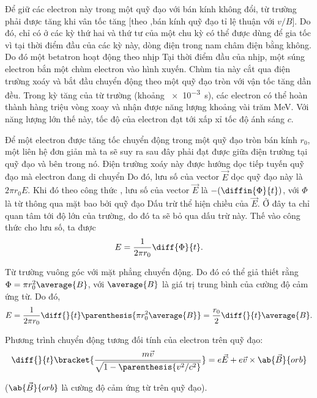 Để giữ các electron này trong một quỹ đạo với bán kính không đổi, từ trường phải được tăng khi vân tốc tăng [theo ,bán kính quỹ đạo tỉ lệ thuận với $v/B$].
Do đó, chỉ có ở các kỳ thứ hai và thứ tư của một chu kỳ có thể được dùng để gia tốc vì tại thời điểm đầu của các kỳ này, dòng điện trong nam châm điện bằng không.
Do đó một betatron hoạt động theo nhịp
Tại thời điểm đầu của nhịp, một súng electron bắn một chùm electron vào hình xuyến.
Chùm tia này cắt qua điện trường xoáy và bắt đầu chuyển động theo một quỹ đạo tròn với vận tốc tăng dần đều.
Trong kỳ tăng của từ trường (khoảng \SI{e-3}{\second}), các electron có thể hoàn thành hàng triệu vòng xoay và nhận được năng lượng khoảng vài trăm \si{\mega\electronvolt}.
Với năng lượng lớn thế này, tốc độ của electron đạt tới xấp xỉ tốc độ ánh sáng $c$.

Để một electron được tăng tốc chuyển động trong một quỹ đạo tròn bán kính $r_0$, một liên hệ đơn giản mà ta sẽ suy ra sau đây phải đạt được giữa điện trường tại quỹ đạo và bên trong nó.
Điện trường xoáy này được hướng dọc tiếp tuyến quỹ đạo mà electron đang di chuyển
Do đó, lưu số của vector $\vec{E}$ dọc quỹ đạo này là $2\pi r_0E$.
Khi đó theo công thức , lưu số của vector $\vec{E}$ là $-(\diffin{\Phi}{t})$, với $\Phi$ là từ thông qua mặt bao bởi quỹ đạo
Dấu trừ thể hiện chiều của $\vec{E}$.
Ở đây ta chỉ quan tâm tới độ lớn của trường, do đó ta sẽ bỏ qua dấu trừ này.
Thế vào công thức cho lưu số, ta được
\begin{equation*}
    E = \frac{1}{2\pi r_0} \diff{\Phi}{t}.
\end{equation*}

\noindent
Từ trường vuông góc với mặt phẳng chuyển động.
Do đó có thể giả thiết rằng $\Phi=\pi r^2_0\average{B}$, với $\average{B}$ là giá trị trung bình của cường độ cảm ứng từ.
Do đó,
\begin{equation}\label{eq:10_30}
    E = \frac{1}{2\pi r_0} \diff{}{t} \parenthesis{ \pi r^2_0 \average{B}} = \frac{r_0}{2} \diff{}{t} \average{B}.
\end{equation}

Phương trình chuyển động tương đối tính của electron trên quỹ đạo:
\begin{equation}\label{eq:10_31}
    \diff{}{t}\bracket{ \frac{m \vec{v}}{\sqrt{1-\parenthesis{v^2/c^2}}} } = e \vec{E} + e \vec{v} \times \ab{\vec{B}}{orb}
\end{equation}

\noindent
($\ab{\vec{B}}{orb}$ là cường độ cảm ứng từ trên quỹ đạo).

